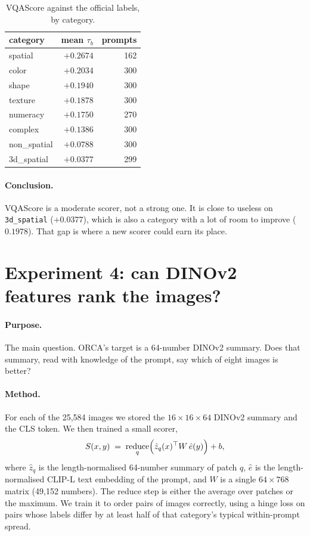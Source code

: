 \documentclass[11pt]{article}
\newcommand{\bad}[1]{\textcolor{red!70!black}{#1}}
\begin{document}
\begin{table}[h]
\centering
\caption{VQAScore against the official labels, by category.}
\begin{tabular}{@{}lrr@{}}
\toprule
category & mean $\tau_b$ & prompts \\
\midrule
spatial      & $+0.2674$ & 162 \\
color        & $+0.2034$ & 300 \\
shape        & $+0.1940$ & 300 \\
texture      & $+0.1878$ & 300 \\
numeracy     & $+0.1750$ & 270 \\
complex      & $+0.1386$ & 300 \\
non\_spatial & $+0.0788$ & 300 \\
3d\_spatial  & \bad{$+0.0377$} & 299 \\
\bottomrule
\end{tabular}
\end{table}

\paragraph{Conclusion.} VQAScore is a moderate scorer, not a strong one. It is close to useless on
\texttt{3d\_spatial} ($+0.0377$), which is also a category with a lot of room to improve ($0.1978$).
That gap is where a new scorer could earn its place.

\section{Experiment 4: can DINOv2 features rank the images?}

\paragraph{Purpose.} The main question. ORCA's target is a 64-number DINOv2 summary. Does that
summary, read with knowledge of the prompt, say which of eight images is better?

\paragraph{Method.} For each of the 25{,}584 images we stored the $16\times16\times64$ DINOv2 summary
and the CLS token. We then trained a small scorer,
\begin{equation}
S(x, y) \;=\; \operatorname*{reduce}_{q} \Bigl( \hat z_q(x)^\top W \, \hat e(y) \Bigr) + b ,
\end{equation}
where $\hat z_q$ is the length-normalised 64-number summary of patch $q$, $\hat e$ is the
length-normalised CLIP-L text embedding of the prompt, and $W$ is a single $64 \times 768$ matrix
(49{,}152 numbers). The reduce step is either the average over patches or the maximum. We train it to
order pairs of images correctly, using a hinge loss on pairs whose labels differ by at least half of
that category's typical within-prompt spread.
\end{document}

